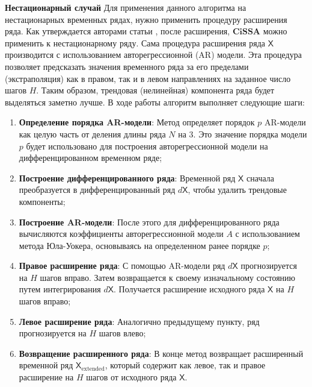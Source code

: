 \documentclass[a4paper, 11pt]{article}
\newcommand{\CISSA}{\textbf{CiSSA}}
\newcommand{\TS}{\mathsf{X}}
\begin{document}
\noindent \textbf{\large{Нестационарный случай}} \newline \newline 
Для применения данного алгоритма на нестационарных временных рядах, нужно применить процедуру расширения ряда. Как утверждается авторами статьи \cite{bogalo2020}, после расширения, $\CISSA$ можно применить к нестационарному ряду.
Сама процедура расширения ряда $\TS$ производится с использованием авторегрессионной (AR) модели. Эта процедура позволяет предсказать значения временного ряда за его пределами (экстраполяция) как в правом, так и в левом направлениях на заданное число шагов $H$. Таким образом, трендовая (нелинейная) компонента ряда будет выделяться заметно лучше. В ходе работы алгоритм выполняет следующие шаги:
\begin{enumerate}
	\item \textbf{Определение порядка AR-модели}:  
	Метод определяет порядок $p$ AR-модели как целую часть от деления длины ряда $N$ на 3. Это значение порядка модели $p$ будет использовано для построения авторегрессионной модели на дифференцированном временном ряде;
	
	\item \textbf{Построение дифференцированного ряда}:  
	Временной ряд $\TS$ сначала преобразуется в дифференцированный ряд $d \TS$, чтобы удалить трендовые компоненты;
	
	\item \textbf{Построение AR-модели}:  
	После этого для дифференцированного ряда вычисляются коэффициенты авторегрессионной модели $A$ с использованием метода Юла-Уокера, основываясь на определенном ранее порядке $p$;
	
	\item \textbf{Правое расширение ряда}:  
	С помощью AR-модели ряд $d\TS$ прогнозируется на $H$ шагов вправо. Затем возвращается к своему изначальному состоянию путем интегрирования $d\TS$. Получается расширение исходного ряда $\TS$ на $H$ шагов вправо;
	
	\item \textbf{Левое расширение ряда}:  
	Аналогично предыдущему пункту, ряд прогнозируется на $H$ шагов влево;
	
	\item \textbf{Возвращение расширенного ряда}:  
	В конце метод возвращает расширенный временной ряд $\TS_{\mathrm{extended}}$, который содержит как левое, так и правое расширение на $H$ шагов от исходного ряда $\TS$.
\end{enumerate}
\end{document}
